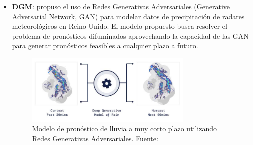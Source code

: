 \begin{itemize}
  \item \textbf{DGM}: \cite{Ravuri2021} propuso el uso de Redes Generativas 
  Adversariales (Generative Adversarial Network, GAN) para modelar datos de 
  precipitación de radares meteorológicos en Reino Unido. El modelo propuesto 
  busca resolver el problema de pronósticos difuminados aprovechando la 
  capacidad de las GAN para generar pronósticos feasibles a cualquier plazo a 
  futuro.
  \begin{figure}[H]
    \centering
    \includegraphics[width=8cm]{E_IMAGENES/3_EstadoArte/dgmr_1}
    \caption{
      Modelo de pronóstico de lluvia a muy corto plazo utilizando Redes 
      Generativas Adversariales. Fuente: \cite{Ravuri2021}
    }
    \label{fig:dgmr_modelo}
  \end{figure}
\end{itemize}

